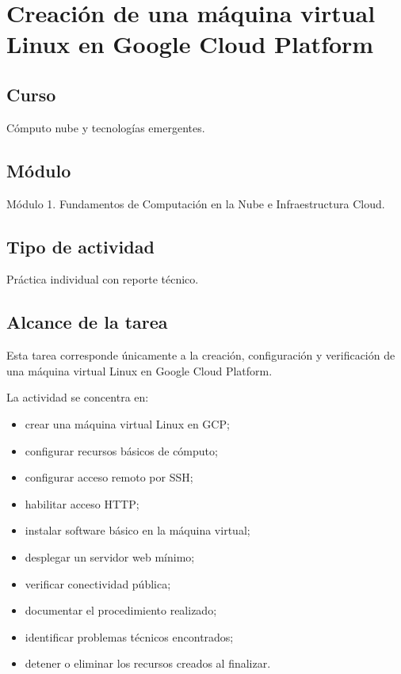 \documentclass[
  coursetitle={Cómputo Nube y Tecnologías Emergentes},
  coursehours={96},
  coursedate={Verano 2026},
  doctype={Tarea 2},
  otherlangs={english,french},
  authorname={Lázaro},
  authorsurname={Bustio-Martínez},
  authortitle={PhD},
  role={Profesor Investigador},
  email={lbustio@inaoe.mx},
  phone={5559504000},
  ext={7459},
  institution={Instituto Nacional de Astrofísica, Óptica y Electrónica (INAOE)},
  department={Maestría en Ciencias en Tecnologías de Seguridad},
  address={Luis Enrique Erro 1, Sta. Ma. Tonantzintla, San Andrés Cholula, CP 72840, Puebla, México},
  margin={0.5in}
]{lbustio_lecture_notes}
\begin{document}
\IberoCover

\section{Creación de una máquina virtual Linux en Google Cloud Platform}
\label{sec:tarea2-vm-gcp}

\subsection{Curso}
\label{sec:tarea2-curso}

Cómputo nube y tecnologías emergentes.

\subsection{Módulo}
\label{sec:tarea2-modulo}

Módulo 1. Fundamentos de Computación en la Nube e Infraestructura Cloud.

\subsection{Tipo de actividad}
\label{sec:tarea2-tipo-actividad}

Práctica individual con reporte técnico.

\subsection{Alcance de la tarea}
\label{sec:tarea2-alcance}

Esta tarea corresponde únicamente a la creación, configuración y verificación de una máquina virtual Linux en Google Cloud Platform.

La actividad se concentra en:

\begin{itemize}
  \item crear una máquina virtual Linux en GCP;
  \item configurar recursos básicos de cómputo;
  \item configurar acceso remoto por SSH;
  \item habilitar acceso HTTP;
  \item instalar software básico en la máquina virtual;
  \item desplegar un servidor web mínimo;
  \item verificar conectividad pública;
  \item documentar el procedimiento realizado;
  \item identificar problemas técnicos encontrados;
  \item detener o eliminar los recursos creados al finalizar.
\end{itemize}
\end{document}
